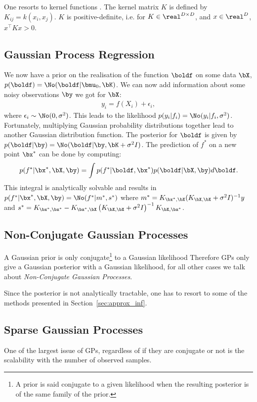 One resorts to kernel functions .
The kernel matrix $K$ is defined by $K_{ij} = k(x_i, x_j)$.
$K$ is positive-definite, i.e. for $K\in \real^{D\times D}$, and $x\in \real^D$, $x^\top K x > 0$.

\subsection{Gaussian Process Regression}

We now have a prior on the realisation of the function $\boldf$ on some data $\bX$, $p(\boldf) = \No(\boldf|\bmu_0, \bK)$.
We can now add information about some noisy observations $\by$ we got for $\bX$:
\begin{align}
y_i = f(X_i) + \epsilon_i,
\end{align}
where $\epsilon_i \sim \No(0,\sigma^2)$.
This leads to the likelihood $p(y_i|f_i) = \No(y_i|f_i, \sigma^2)$.
Fortunately, multiplying Gaussian probability distributions together lead to another Gaussian distribution function.
The posterior for $\boldf$ is given by $p(\boldf|\by) = \No(\boldf|\by, \bK + \sigma^2 I)$.
The prediction of $f^*$ on a new point $\bx^*$ can be done by computing:
\begin{align}
p(f^*|\bx^*,\bX,\by) = \int p(f^*|\boldf,\bx^*)p(\boldf|\bX,\by)d\boldf.
\end{align}	
This integral is analytically solvable and results in $p(f^*|\bx^*,\bX,\by)=\No(f^*|m^*,s^*)$ where $m^* = K_{\bx^*,\bX}(K_{\bX,\bX} + \sigma^{2}I)^{-1}y$ and $s^*=K_{\bx^*,\bx^*} - K_{\bx^*,\bX}\left(K_{\bX,\bX}+\sigma^2I\right)^{-1}K_{\bX,\bx^*}$.

\subsection{Non-Conjugate Gaussian Processes}

A Gaussian prior is only conjugate\footnote{A prior is said conjugate to a given likelihood when the resulting posterior is of the same family of the prior.} to a Gaussian likelihood
Therefore \ac{GPs} only give a Gaussian posterior with a Gaussian likelihood, for all other cases we talk about \textit{Non-Conjugate Gaussian Processes}.

Since the posterior is not analytically tractable, one has to resort to some of the methods presented in Section~\ref{sec:approx_inf}.

\subsection{Sparse Gaussian Processes}
One of the largest issue of \ac{GPs}, regardless of if they are conjugate or not is the scalability with the number of observed samples.



